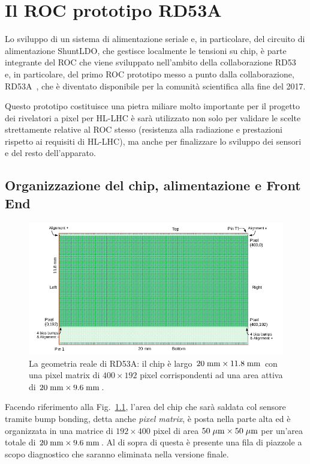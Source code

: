 \chapter{Il ROC prototipo RD53A}
\label{cap:RD53A}

Lo sviluppo di un sistema di alimentazione seriale e, in particolare, del circuito di alimentazione ShuntLDO, che gestisce localmente le tensioni su chip, è parte integrante del ROC che viene sviluppato nell'ambito della collaborazione RD53~\cite{RD53} e, in particolare, del primo ROC prototipo messo a punto dalla collaborazione, RD53A~\cite{RD53A}, che \`e diventato disponibile per la comunit\`a scientifica alla fine del 2017.

Questo prototipo costituisce una pietra miliare molto importante per il progetto dei rivelatori a pixel per HL-LHC \`e sar\`a utilizzato non solo per validare le scelte strettamente relative al ROC stesso (resistenza alla radiazione e prestazioni rispetto ai requisiti di HL-LHC), ma anche per finalizzare lo sviluppo dei sensori e del resto dell'apparato.

\section{Organizzazione del chip, alimentazione e Front End}
\label{Organizzazionechip}


\begin{figure}
\centering
\includegraphics[scale=.4]{Immagini/RD53ALayout}
\caption{La geometria reale di RD53A: il chip è largo $20\rm \; mm \times 11.8\rm \; mm$ con una pixel matrix di $400\times 192$ pixel corrispondenti ad una area attiva di $20\rm \; mm \times 9.6\rm \; mm$.}
\label{RD53ALayout}
\end{figure}
Facendo riferimento alla Fig.~\ref{RD53ALayout}, l'area del chip che sarà saldata col sensore tramite bump bonding, detta anche {\em pixel matrix}, è posta nella parte alta ed è organizzata in una matrice di $192\times400$ pixel di area $50\; \mu \rm m \times 50 \; \mu \rm m$ per un'area totale di $20\rm \; mm \times 9.6\rm \; mm$.
Al di sopra di questa è presente una fila di piazzole a scopo diagnostico che saranno eliminata nella versione finale.

